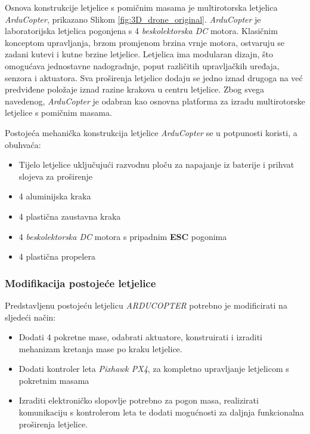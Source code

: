 \documentclass[11pt,a4paper]{article}
\begin{document}
Osnova konstrukcije letjelice s pomičnim masama je multirotorska letjelica  \textit{ArduCopter}, prikazano Slikom \ref{fig:3D_drone_original}.  \textit{ArduCopter} je laboratorijska letjelica pogonjena s 4 \textit{beskolektorska DC} motora. Klasičnim konceptom upravljanja, brzom promjenom brzina vrnje motora, ostvaruju se zadani kutevi i kutne brzine letjelice. Letjelica ima modularan dizajn, što omogućava jednostavne nadogradnje, poput različitih upravljačkih uređaja, senzora i aktuatora. Sva proširenja letjelice dodaju se jedno iznad drugoga na već predviđene položaje iznad razine krakova u centru letjelice. Zbog svega navedenog,  \textit{ArduCopter} je odabran kao osnovna platforma za izradu multirotorske letjelice s pomičnim masama.

\medskip

Postojeća mehanička konstrukcija letjelice  \textit{ArduCopter} se u potpunosti koristi, a obuhvaća: 
\begin{center}
	\begin{itemize}
		\item Tijelo letjelice uključujući razvodnu ploču za napajanje iz baterije i prihvat slojeva za proširenje
		\item 4 aluminijska kraka
		\item 4 plastična zaustavna kraka
		\item 4  \textit{beskolektorska DC} motora s pripadnim \textbf{ESC} pogonima
		\item 4 plastična propelera
	\end{itemize}
\end{center}

\subsubsection*{Modifikacija postojeće letjelice}
Predstavljenu postojeću letjelicu \textit{ARDUCOPTER} potrebno je modificirati na sljedeći način:
\begin{center}
	\begin{itemize}
		\item Dodati 4 pokretne mase, odabrati aktuatore, konstruirati i izraditi mehanizam kretanja mase po kraku letjelice.
		\item Dodati kontroler leta \textit{Pixhawk PX4}, za kompletno upravljanje letjelicom s pokretnim masama
		\item Izraditi elektroničko slopovlje potrebno za pogon masa, realizirati komunikaciju s kontrolerom leta te dodati mogućnosti za daljnja funkcionalna proširenja letjelice.
	\end{itemize}
\end{center}
\end{document}
